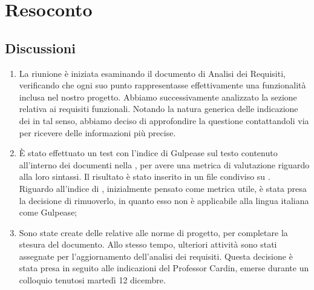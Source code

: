 \section{Resoconto} \label{sec:resoconto}
\subsection{Discussioni} \label{subsec:resdiscussione}
\begin{enumerate}
    \item  La riunione è iniziata esaminando il documento di Analisi dei Requisiti, verificando che ogni suo punto rappresentasse effettivamente una funzionalità inclusa nel nostro progetto. Abbiamo successivamente analizzato la sezione relativa ai requisiti funzionali. Notando la natura generica delle indicazione dei  in tal senso, abbiamo deciso di approfondire la questione contattandoli via  per ricevere delle informazioni più precise.
    
    \item È stato effettuato un test con l'indice di Gulpease sul testo contenuto all'interno dei documenti nella , per avere una metrica di valutazione riguardo alla loro sintassi. Il risultato è stato inserito in un file condiviso su . \\
    Riguardo all'indice di , inizialmente pensato come metrica utile, è stata presa la decisione di rimuoverlo, in quanto esso non è applicabile alla lingua italiana come Gulpease;

    \item Sono state create delle  relative alle norme di progetto, per completare la stesura del documento. Allo stesso tempo, ulteriori attività sono stati assegnate per l'aggiornamento dell'analisi dei requisiti. Questa decisione è stata presa in seguito alle indicazioni del Professor Cardin, emerse durante un colloquio tenutosi martedì 12 dicembre.
    
\end{enumerate}

